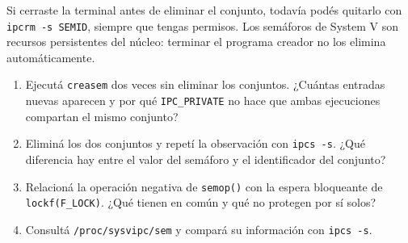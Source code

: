 \documentclass[11pt,a4paper]{article}
\begin{document}
Si cerraste la terminal antes de eliminar el conjunto, todavía podés quitarlo
con \texttt{ipcrm -s SEMID}, siempre que tengas permisos. Los semáforos de
System V son recursos persistentes del núcleo: terminar el programa creador no
los elimina automáticamente.

\begin{extrabox}
\begin{enumerate}
  \item Ejecutá \texttt{creasem} dos veces sin eliminar los conjuntos.
  ¿Cuántas entradas nuevas aparecen y por qué \texttt{IPC\_PRIVATE} no hace
  que ambas ejecuciones compartan el mismo conjunto?
  \item Eliminá los dos conjuntos y repetí la observación con
  \texttt{ipcs -s}. ¿Qué diferencia hay entre el valor del semáforo y el
  identificador del conjunto?
  \item Relacioná la operación negativa de \texttt{semop()} con la espera
  bloqueante de \texttt{lockf(F\_LOCK)}. ¿Qué tienen en común y qué no
  protegen por sí solos?
  \item Consultá \texttt{/proc/sysvipc/sem} y compará su información con
  \texttt{ipcs -s}.
\end{enumerate}
\end{extrabox}
\end{document}
